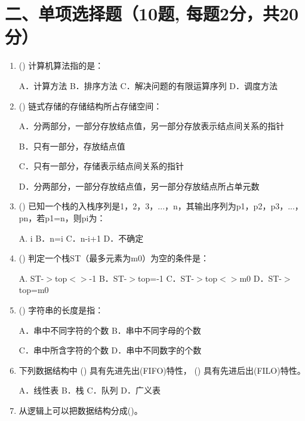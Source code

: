\documentclass{../../note}
\begin{document}
\vspace{1cm}

\section*{二、单项选择题（10题, 每题2分，共20分）}

\begin{enumerate}
\item (\hspace{0.5cm}) 计算机算法指的是：

A．计算方法 B．排序方法 C．解决问题的有限运算序列 D．调度方法

\item (\hspace{0.5cm}) 链式存储的存储结构所占存储空间：

A．分两部分，一部分存放结点值，另一部分存放表示结点间关系的指针

B．只有一部分，存放结点值

C．只有一部分，存储表示结点间关系的指针

D．分两部分，一部分存放结点值，另一部分存放结点所占单元数

\item (\hspace{0.5cm}) 已知一个栈的入栈序列是1，2，3，...，n，其输出序列为p1，p2，p3，...，pn，若p1=n，则pi为：

A. i B．n=i C．n-i+1 D．不确定

\item (\hspace{0.5cm}) 判定一个栈ST（最多元素为m0）为空的条件是：

A. ST-$>$top$<>$-1 B．ST-$>$top=-1 C．ST-$>$top$<>$m0 D．ST-$>$top=m0

\item (\hspace{0.5cm}) 字符串的长度是指：

A．串中不同字符的个数 B．串中不同字母的个数

C．串中所含字符的个数 D．串中不同数字的个数

\item 下列数据结构中 (\hspace{0.5cm}) 具有先进先出(FIFO)特性， (\hspace{0.5cm}) 具有先进后出(FILO)特性。

A．线性表 B．栈 C．队列 D．广义表

\item 从逻辑上可以把数据结构分成(\hspace{0.5cm})。


\end{enumerate}
\end{document}
